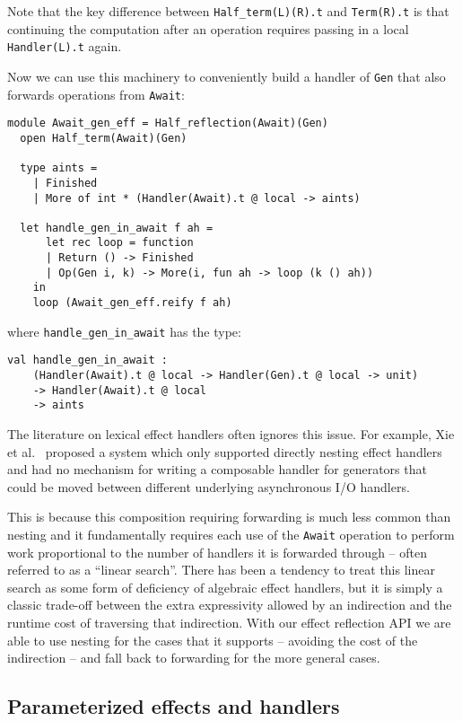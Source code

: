 \documentclass[acmsmall, screen, review, anonymous]{acmart}
\theoremstyle{definition}
\begin{document}
Note that the key difference between
\lstinline[style=oxcaml]{Half_term(L)(R).t} and
\lstinline[style=oxcaml]{Term(R).t} is that continuing the computation
after an operation requires passing in a local
\lstinline[style=oxcaml]{Handler(L).t} again.

Now we can use this machinery to conveniently build a handler of
\lstinline[style=oxcaml]{Gen} that also forwards operations from
\lstinline[style=oxcaml]{Await}:
\begin{lstlisting}[style=oxcaml]
  module Await_gen_eff = Half_reflection(Await)(Gen)
  open Half_term(Await)(Gen)

  type aints =
    | Finished
    | More of int * (Handler(Await).t @ local -> aints)

  let handle_gen_in_await f ah =
      let rec loop = function
      | Return () -> Finished
      | Op(Gen i, k) -> More(i, fun ah -> loop (k () ah))
    in
    loop (Await_gen_eff.reify f ah)
\end{lstlisting}
where \lstinline[style=oxcaml]{handle_gen_in_await} has the type:
\begin{lstlisting}[style=oxcaml]
  val handle_gen_in_await :
    (Handler(Await).t @ local -> Handler(Gen).t @ local -> unit)
    -> Handler(Await).t @ local
    -> aints
\end{lstlisting}

The literature on lexical effect handlers often ignores this issue. For
example, Xie et al.~\cite{xie2020effect} proposed a system which only
supported directly nesting effect handlers and had no mechanism for
writing a composable handler for generators that could be moved between
different underlying asynchronous I/O handlers.

This is because this composition requiring forwarding is much less
common than nesting and it fundamentally requires each use of the
\lstinline[style=oxcaml]{Await} operation to perform work proportional to
the number of handlers it is forwarded through -- often referred to as a
``linear search''. There has been a tendency to treat this linear search
as some form of deficiency of algebraic effect handlers, but it is
simply a classic trade-off between the extra expressivity allowed by an
indirection and the runtime cost of traversing that indirection. With
our effect reflection API we are able to use nesting for the cases that
it supports -- avoiding the cost of the indirection -- and fall back to
forwarding for the more general cases.

\subsection{Parameterized effects and handlers}
\end{document}
